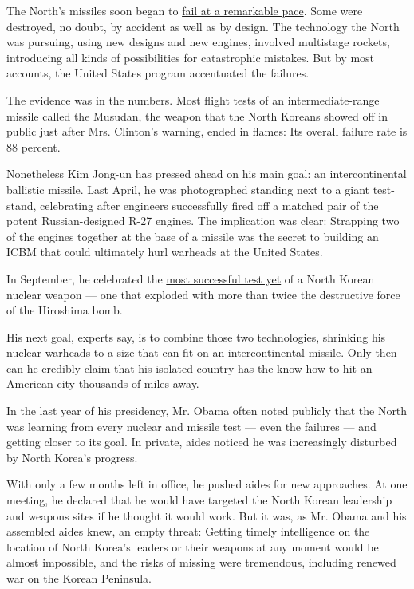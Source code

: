 The North's missiles soon began to
\href{http://www.globalsecurity.org/wmd/world/dprk/nd-b5.htm}{fail at a
remarkable pace}. Some were destroyed, no doubt, by accident as well as
by design. The technology the North was pursuing, using new designs and
new engines, involved multistage rockets, introducing all kinds of
possibilities for catastrophic mistakes. But by most accounts, the
United States program accentuated the failures.

The evidence was in the numbers. Most flight tests of an
intermediate-range missile called the Musudan, the weapon that the North
Koreans showed off in public just after Mrs. Clinton's warning, ended in
flames: Its overall failure rate is 88 percent.

Nonetheless Kim Jong-un has pressed ahead on his main goal: an
intercontinental ballistic missile. Last April, he was photographed
standing next to a giant test-stand, celebrating after engineers
\href{http://www.globalsecurity.org/wmd/world/dprk/kn-14-first-stage-main-engine-cluster-static-test-firing-4-9-2016.htm}{successfully
fired off a matched pair} of the potent Russian-designed R-27 engines.
The implication was clear: Strapping two of the engines together at the
base of a missile was the secret to building an ICBM that could
ultimately hurl warheads at the United States.

In September, he celebrated the
\href{http://www.nti.org/analysis/articles/north-koreas-nuclear-year-reviewand-whats-next/}{most
successful test yet} of a North Korean nuclear weapon --- one that
exploded with more than twice the destructive force of the Hiroshima
bomb.

His next goal, experts say, is to combine those two technologies,
shrinking his nuclear warheads to a size that can fit on an
intercontinental missile. Only then can he credibly claim that his
isolated country has the know-how to hit an American city thousands of
miles away.

In the last year of his presidency, Mr. Obama often noted publicly that
the North was learning from every nuclear and missile test --- even the
failures --- and getting closer to its goal. In private, aides noticed
he was increasingly disturbed by North Korea's progress.

With only a few months left in office, he pushed aides for new
approaches. At one meeting, he declared that he would have targeted the
North Korean leadership and weapons sites if he thought it would work.
But it was, as Mr. Obama and his assembled aides knew, an empty threat:
Getting timely intelligence on the location of North Korea's leaders or
their weapons at any moment would be almost impossible, and the risks of
missing were tremendous, including renewed war on the Korean Peninsula.

